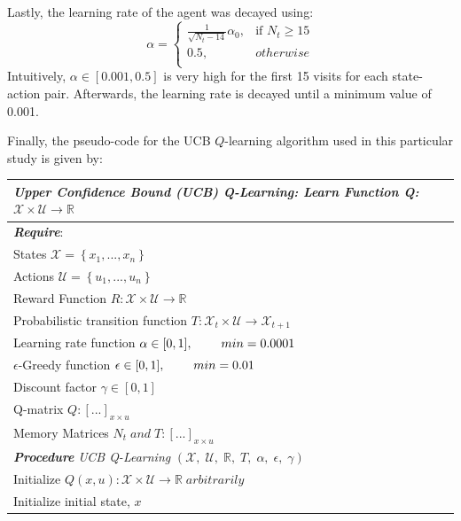 Lastly, the learning rate of the agent was decayed using:
\[
    \alpha =
\begin{cases}
    \frac{1}{\sqrt{N_t - 14}}\alpha_0,              & \text{if } N_t  \geq 15 \\
    0.5,              & otherwise \\
\end{cases}
\]
Intuitively, $\alpha \in [0.001, 0.5]$ is very high for the first 15 visits for each state-action pair.  Afterwards, the learning rate is decayed until a minimum value of 0.001.

Finally, the pseudo-code for the UCB $Q$-learning algorithm used in this particular study is given by:
\begin{table}[h]
	\def\arraystretch{1.2}
	\begin{tabular}{p{15cm}}
	\hline
	\emph{Upper Confidence Bound (UCB) Q-Learning: Learn Function Q: $\mathcal{X} \times \mathcal{U} \rightarrow \mathbb{R}$} \\ \hline
	\textbf{\emph{Require}}: \\
		States $\mathcal{X} = \left\{ x_1, ..., x_n \right\}$ \\
		Actions $\mathcal{U} = \left\{u_1, ..., u_n \right\}$ \\
		Reward Function $R: \mathcal{X} \times \mathcal{U} \rightarrow \mathbb{R}$ \\
		Probabilistic transition function $T: \mathcal{X}_t \times \mathcal{U} \rightarrow \mathcal{X}_{t+1}$ \\
		Learning rate function $\alpha \in [0, 1], \hspace{0.8cm} min = 0.0001$ \\
		$\epsilon$-Greedy function $\epsilon \in [0, 1], \hspace{0.8cm} min = 0.01$ \\
		Discount factor $\gamma \in [0, 1]$ \\
		Q-matrix $Q:[...]_{x \times u}$ \\
		Memory Matrices $N_t \; and \; T : [...]_{x \times u}$ \\
		\textbf{\emph{Procedure}} \emph{UCB Q-Learning} $(\mathcal{X},\; \mathcal{U},\; \mathbb{R},\; T,\; \alpha,\; \epsilon,\; \gamma)$ \\
		\hspace{1cm}  Initialize $Q(x, u): \mathcal{X} \times \mathcal{U} \rightarrow \mathbb{R} \; arbitrarily$ \\
		\hspace{1cm} Initialize initial state, $x$ \\

\end{tabular}
\end{table}
